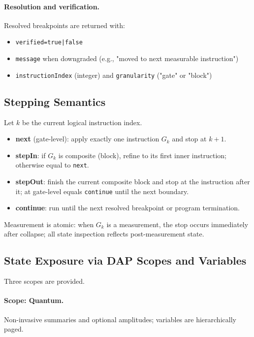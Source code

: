 \documentclass[12pt]{article}
\begin{document}
\paragraph{Resolution and verification.}
Resolved breakpoints are returned with:
\begin{itemize}
  \item \texttt{verified=true|false}
  \item \texttt{message} when downgraded (e.g., "moved to next measurable instruction")
  \item \texttt{instructionIndex} (integer) and \texttt{granularity} ("gate" or "block")
\end{itemize}

\subsection{Stepping Semantics}

Let $k$ be the current logical instruction index.

\begin{itemize}
  \item \textbf{next} (gate-level): apply exactly one instruction $G_k$ and stop at $k{+}1$.
  \item \textbf{stepIn}: if $G_k$ is composite (block), refine to its first inner instruction; otherwise equal to \texttt{next}.
  \item \textbf{stepOut}: finish the current composite block and stop at the instruction after it; at gate-level equals \texttt{continue} until the next boundary.
  \item \textbf{continue}: run until the next resolved breakpoint or program termination.
\end{itemize}

Measurement is atomic: when $G_k$ is a measurement, the stop occurs immediately after collapse; all state inspection reflects post-measurement state.

\subsection{State Exposure via DAP Scopes and Variables}

Three scopes are provided.

\paragraph{Scope: Quantum.}
Non-invasive summaries and optional amplitudes; variables are hierarchically paged.
\end{document}
